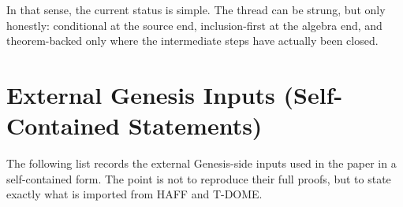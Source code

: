 \documentclass[12pt]{article}
\theoremstyle{definition}
\theoremstyle{remark}
\begin{document}
In that sense, the current status is simple. The thread can be strung,
but only honestly: conditional at the source end, inclusion-first at the
algebra end, and theorem-backed only where the intermediate steps have
actually been closed.

\appendix

\section{External Genesis Inputs (Self-Contained Statements)}\label{app:premises}

The following list records the external Genesis-side inputs used in the
paper in a self-contained form. The point is not to reproduce their full
proofs, but to state exactly what is imported from HAFF and T-DOME.
\end{document}
